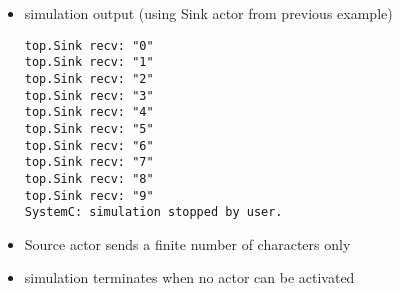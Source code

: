 \begin{frame}[fragile=singleslide]
\begin{itemize}
\item simulation output (using Sink actor from previous example)
\begin{lstlisting}
top.Sink recv: "0"
top.Sink recv: "1"
top.Sink recv: "2"
top.Sink recv: "3"
top.Sink recv: "4"
top.Sink recv: "5"
top.Sink recv: "6"
top.Sink recv: "7"
top.Sink recv: "8"
top.Sink recv: "9"
SystemC: simulation stopped by user.
\end{lstlisting}
\item Source actor sends a finite number of characters only
\item simulation terminates when no actor can be activated
\end{itemize}
\end{frame}





%





